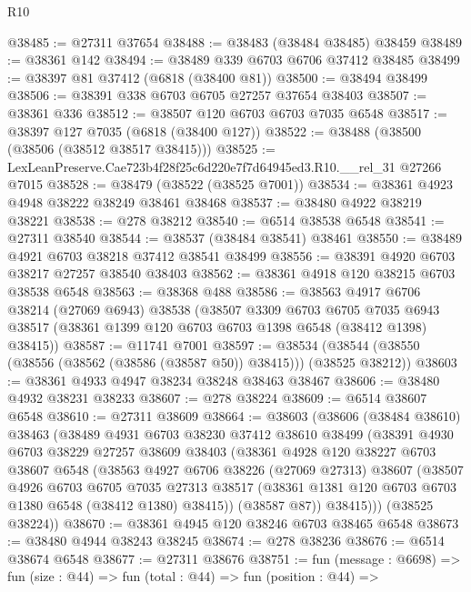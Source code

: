 \begin{lexlean}{R10}
\begin{coremodule}
@38485 := @27311 @37654
@38488 := @38483 (@38484 @38485) @38459
@38489 := @38361 @142
@38494 := @38489 @339 @6703 @6706 @37412 @38485
@38499 := @38397 @81 @37412 (@6818 (@38400 @81))
@38500 := @38494 @38499
@38506 := @38391 @338 @6703 @6705 @27257 @37654 @38403
@38507 := @38361 @336
@38512 := @38507 @120 @6703 @6703 @7035 @6548
@38517 := @38397 @127 @7035 (@6818 (@38400 @127))
@38522 := @38488 (@38500 (@38506 (@38512 @38517 @38415)))
@38525 := LexLeanPreserve.Cae723b4f28f25c6d220e7f7d64945ed3.R10.__rel_31 @27266 @7015
@38528 := @38479 (@38522 (@38525 @7001))
@38534 := @38361 @4923 @4948 @38222 @38249 @38461 @38468
@38537 := @38480 @4922 @38219 @38221
@38538 := @278 @38212
@38540 := @6514 @38538 @6548
@38541 := @27311 @38540
@38544 := @38537 (@38484 @38541) @38461
@38550 := @38489 @4921 @6703 @38218 @37412 @38541 @38499
@38556 := @38391 @4920 @6703 @38217 @27257 @38540 @38403
@38562 := @38361 @4918 @120 @38215 @6703 @38538 @6548
@38563 := @38368 @488
@38586 := @38563
    @4917
    @6706
    @38214
    (@27069 @6943)
    @38538
    (@38507
      @3309
      @6703
      @6705
      @7035
      @6943
      @38517
      (@38361 @1399 @120 @6703 @6703 @1398 @6548 (@38412 @1398) @38415))
@38587 := @11741 @7001
@38597 := @38534 (@38544 (@38550 (@38556 (@38562 (@38586 (@38587 @50)) @38415))) (@38525 @38212))
@38603 := @38361 @4933 @4947 @38234 @38248 @38463 @38467
@38606 := @38480 @4932 @38231 @38233
@38607 := @278 @38224
@38609 := @6514 @38607 @6548
@38610 := @27311 @38609
@38664 := @38603
    (@38606
      (@38484 @38610)
      @38463
      (@38489
        @4931
        @6703
        @38230
        @37412
        @38610
        @38499
        (@38391
          @4930
          @6703
          @38229
          @27257
          @38609
          @38403
          (@38361
            @4928
            @120
            @38227
            @6703
            @38607
            @6548
            (@38563
              @4927
              @6706
              @38226
              (@27069 @27313)
              @38607
              (@38507
                @4926
                @6703
                @6705
                @7035
                @27313
                @38517
                (@38361 @1381 @120 @6703 @6703 @1380 @6548 (@38412 @1380) @38415))
              (@38587 @87))
            @38415)))
      (@38525 @38224))
@38670 := @38361 @4945 @120 @38246 @6703 @38465 @6548
@38673 := @38480 @4944 @38243 @38245
@38674 := @278 @38236
@38676 := @6514 @38674 @6548
@38677 := @27311 @38676
@38751 := fun (message : @6698) =>
  fun (size : @44) =>
  fun (total : @44) =>
  fun (position : @44) =>

\end{coremodule}
\end{lexlean}
